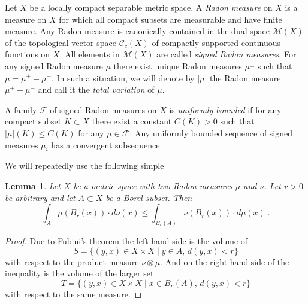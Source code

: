 \documentclass[12pt,leqno,intlimits]{amsart}
\numberwithin{equation}{section}
\newtheorem{lem}[thm]{Lemma}
\theoremstyle{definition}
\theoremstyle{remark}
\begin{document}
Let $X$ be a locally compact separable metric space. A \emph{Radon measure} on $X$ is a measure on $X$ for which all compact subsets are measurable and have finite measure.
Any Radon measure is canonically contained in the dual space $\mathcal M(X)$ of the topological vector space $\mathcal C_c (X)$ of compactly supported continuous functions on $X$.
All elements in $\mathcal M(X)$ are called \emph{signed Radon measures}. For any signed Radon measure $\mu$ there exist unique Radon measures $\mu ^{\pm}$ such that $\mu =\mu ^+- \mu ^-$.
In such a situation, we will denote by $|\mu |$ the Radon measure $\mu ^+ +\mu ^-$ and call it the \emph{total variation} of $\mu$.



 A family   $\mathcal F$ of signed  Radon measures on $X$  is \emph{uniformly bounded} if  for any compact subset $K\subset X$ there exist a constant $C(K)>0$ such that $|\mu| (K) \leq C(K)$ for any $\mu \in \mathcal F$.
   Any uniformly bounded sequence of signed measures $\mu _i$  has a convergent subsequence.


We will repeatedly use the following simple


\begin{lem} \label{lem:exchange}
Let $X$ be a metric space with two Radon measures $\mu $ and $\nu$. Let $r>0$ be arbitrary and let  $A\subset X$ be a Borel subset. Then
 $$\int _A \mu (B_r(x)) \cdot d\nu (x) \leq \int _{B_r (A)}  \nu (B_r (x)) \cdot d\mu (x) \; .$$
\end{lem}

\begin{proof} Due to  Fubini's theorem
the left  hand side is the volume of  $$S=\{(y,x) \in X\times X \;| \;  y \in A,\, d(y,x) <r \}$$ with respect to the product measure $\nu \otimes \mu$.
And on the right  hand side of the inequality is the volume of the larger set $$T=\{(y,x) \in  X\times X \; | \; x\in B_r(A), \, d(y,x)<r \}$$ with respect to the same measure.
\end{proof}
\end{document}
